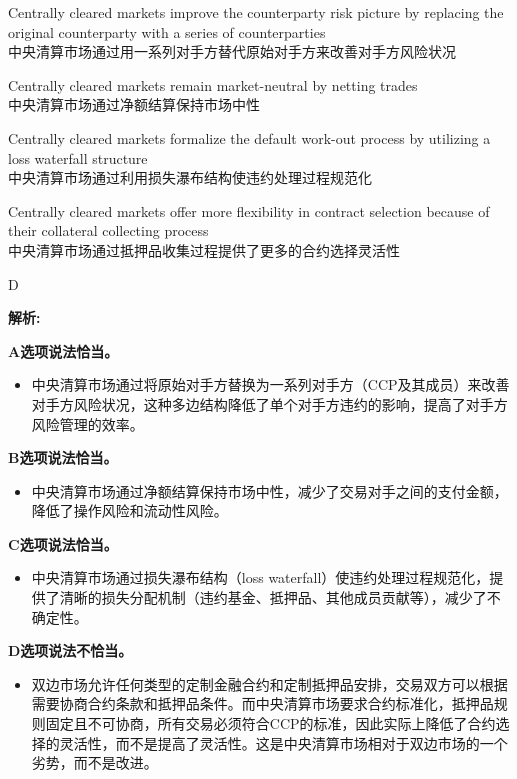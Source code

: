 \documentclass{article}
\newenvironment{explanation}
{\textbf{解析:}\par}
{\par}
\begin{document}
\begin{choices}
    \item Centrally cleared markets improve the counterparty risk picture by replacing the original counterparty with a series of counterparties\\中央清算市场通过用一系列对手方替代原始对手方来改善对手方风险状况
    \item Centrally cleared markets remain market-neutral by netting trades\\中央清算市场通过净额结算保持市场中性
    \item Centrally cleared markets formalize the default work-out process by utilizing a loss waterfall structure\\中央清算市场通过利用损失瀑布结构使违约处理过程规范化
    \item Centrally cleared markets offer more flexibility in contract selection because of their collateral collecting process\\中央清算市场通过抵押品收集过程提供了更多的合约选择灵活性
\end{choices}

\begin{correctanswer}
    D
\end{correctanswer}

\begin{explanation}
    \textbf{A选项说法恰当。}
    \begin{itemize}
        \item 中央清算市场通过将原始对手方替换为一系列对手方（CCP及其成员）来改善对手方风险状况，这种多边结构降低了单个对手方违约的影响，提高了对手方风险管理的效率。
    \end{itemize}

    \textbf{B选项说法恰当。}
    \begin{itemize}
        \item 中央清算市场通过净额结算保持市场中性，减少了交易对手之间的支付金额，降低了操作风险和流动性风险。
    \end{itemize}

    \textbf{C选项说法恰当。}
    \begin{itemize}
        \item 中央清算市场通过损失瀑布结构（loss waterfall）使违约处理过程规范化，提供了清晰的损失分配机制（违约基金、抵押品、其他成员贡献等），减少了不确定性。
    \end{itemize}

    \textbf{D选项说法不恰当。}
    \begin{itemize}
        \item 双边市场允许任何类型的定制金融合约和定制抵押品安排，交易双方可以根据需要协商合约条款和抵押品条件。而中央清算市场要求合约标准化，抵押品规则固定且不可协商，所有交易必须符合CCP的标准，因此实际上降低了合约选择的灵活性，而不是提高了灵活性。这是中央清算市场相对于双边市场的一个劣势，而不是改进。
    \end{itemize}
\end{explanation}
\end{document}
